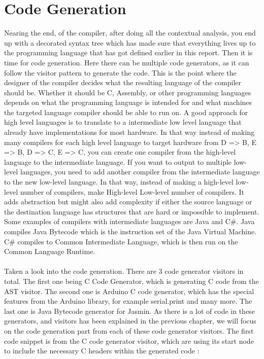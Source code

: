 \section{Code Generation}
Nearing the end, of the compiler, after doing all the contextual analysis, you end up with a decorated syntax tree which has made sure that everything lives up to the programming language that has got defined earlier in this report. Then it is time for code generation.
Here there can be multiple code generators, as it can follow the visitor pattern to generate the code. This is the point where the designer of the compiler decides what the resulting language of the compiler should be. Whether it should be C, Assembly, or other programming languages depends on what the programming language is intended for and what machines the targeted language compiler should be able to run on. 
A good approach for high level languages is to translate to a intermediate low level language that already have implementations for most hardware.  
In that way instead of making many compilers for each high level language to target hardware from D => B, E => B, D => C, E => C, you can create one compiler from the high-level language to the intermediate language. If you want to output to multiple low-level languages, you need to add another compiler from the intermediate language to the new low-level language. In that way, instead of making a high-level \* low-level number of compilers, make High-level \+ Low-level number of compilers. It adds abstraction but might also add complexity if either the source language or the destination language has structures that are hard or impossible to implement. Some examples of compilers with intermediate languages are Java and C\#. Java compiles Java Bytecode which is the instruction set of the Java Virtual Machine. C\# compiles to Common Intermediate Language, which is then run on the Common Language Runtime.\\
\\
Taken a look into the code generation. There are 3 code generator visitors in total. The first one being C Code Generator, which is generating C code from the AST visitor. The second one is Arduino C code generator, which has the special features from the Arduino library, for example serial.print and many more. The last one is Java Bytecode generator for Jasmin. As there is a lot of code in these generators, and visitors has been explained in the previous chapter, we will focus on the code generation part from each of these code generator visitors.
The first code snippet is from the C code generator visitor, which are using its start node to include the necessary C headers within the generated code : \\
